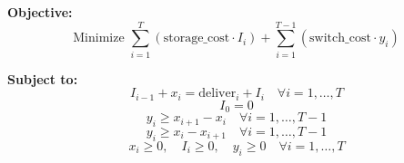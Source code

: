 \documentclass{article}
\begin{document}
\textbf{Objective:}
\[
\text{Minimize } \sum_{i=1}^{T} (\text{storage\_cost} \cdot I_i) + \sum_{i=1}^{T-1} (\text{switch\_cost} \cdot y_i)
\]

\textbf{Subject to:}
\[
I_{i-1} + x_i = \text{deliver}_i + I_i \quad \forall i = 1, \ldots, T
\]
\[
I_0 = 0 
\]
\[
y_i \geq x_{i+1} - x_i \quad \forall i = 1, \ldots, T-1
\]
\[
y_i \geq x_i - x_{i+1} \quad \forall i = 1, \ldots, T-1
\]
\[
x_i \geq 0, \quad I_i \geq 0, \quad y_i \geq 0 \quad \forall i = 1, \ldots, T
\]
\end{document}
